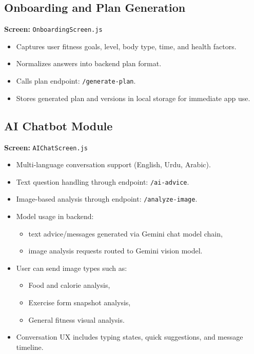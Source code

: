 \documentclass[12pt,a4paper]{article}
\begin{document}
\subsection{Onboarding and Plan Generation}
\textbf{Screen:} \texttt{OnboardingScreen.js}
\begin{itemize}[leftmargin=1.2cm]
  \item Captures user fitness goals, level, body type, time, and health factors.
  \item Normalizes answers into backend plan format.
  \item Calls plan endpoint: \texttt{/generate-plan}.
  \item Stores generated plan and versions in local storage for immediate app use.
\end{itemize}

\subsection{AI Chatbot Module}
\textbf{Screen:} \texttt{AIChatScreen.js}
\begin{itemize}[leftmargin=1.2cm]
  \item Multi-language conversation support (English, Urdu, Arabic).
  \item Text question handling through endpoint: \texttt{/ai-advice}.
  \item Image-based analysis through endpoint: \texttt{/analyze-image}.
  \item Model usage in backend:
  \begin{itemize}
    \item text advice/messages generated via Gemini chat model chain,
    \item image analysis requests routed to Gemini vision model.
  \end{itemize}
  \item User can send image types such as:
  \begin{itemize}
    \item Food and calorie analysis,
    \item Exercise form snapshot analysis,
    \item General fitness visual analysis.
  \end{itemize}
  \item Conversation UX includes typing states, quick suggestions, and message timeline.
\end{itemize}
\end{document}
